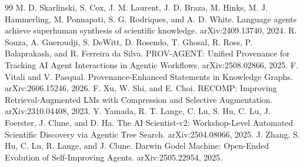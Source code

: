 \documentclass[11pt]{article}
\begin{document}
\begin{thebibliography}{99}
 M. D. Skarlinski, S. Cox, J. M. Laurent, J. D. Braza, M. Hinks, M. J. Hammerling, M. Ponnapati, S. G. Rodriques, and A. D. White. Language agents achieve superhuman synthesis of scientific knowledge. arXiv:2409.13740, 2024.
 R. Souza, A. Gueroudji, S. DeWitt, D. Rosendo, T. Ghosal, R. Ross, P. Balaprakash, and R. Ferreira da Silva. PROV-AGENT: Unified Provenance for Tracking AI Agent Interactions in Agentic Workflows. arXiv:2508.02866, 2025.
 F. Vitali and V. Pasqual. Provenance-Enhanced Statements in Knowledge Graphs. arXiv:2606.15246, 2026.
 F. Xu, W. Shi, and E. Choi. RECOMP: Improving Retrieval-Augmented LMs with Compression and Selective Augmentation. arXiv:2310.04408, 2023.
 Y. Yamada, R. T. Lange, C. Lu, S. Hu, C. Lu, J. Foerster, J. Clune, and D. Ha. The AI Scientist-v2: Workshop-Level Automated Scientific Discovery via Agentic Tree Search. arXiv:2504.08066, 2025.
 J. Zhang, S. Hu, C. Lu, R. Lange, and J. Clune. Darwin Godel Machine: Open-Ended Evolution of Self-Improving Agents. arXiv:2505.22954, 2025.
\end{thebibliography}
\end{document}

